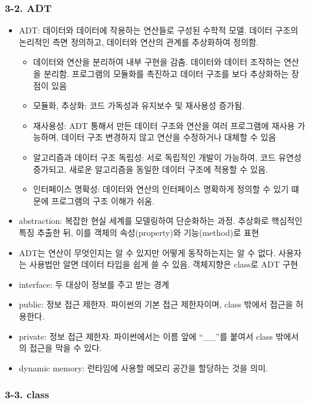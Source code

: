 \hypertarget{adt}{%
\subsubsection{3-2. ADT}\label{adt}}

\begin{itemize}
\tightlist
\item
  ADT: 데이터와 데이터에 작용하는 연산들로 구성된 수학적 모델. 데이터
  구조의 논리적인 측면 정의하고, 데이터와 연산의 관계를 추상화하여
  정의함.

  \begin{itemize}
  \tightlist
  \item
    데이터와 연산을 분리하여 내부 구현을 감춤. 데이터와 데이터 조작하는
    연산을 분리함. 프로그램의 모듈화를 촉진하고 데이터 구조를 보다
    추상화하는 장점이 있음
  \item
    모듈화, 추상화: 코드 가독성과 유지보수 및 재사용성 증가됨.
  \item
    재사용성: ADT 통해서 만든 데이터 구조와 연산을 여러 프로그램에
    재사용 가능하며, 데이터 구조 변경하지 않고 연산을 수정하거나 대체할
    수 있음
  \item
    알고리즘과 데이터 구조 독립성: 서로 독립적인 개발이 가능하여, 코드
    유연성 증가되고, 새로운 알고리즘을 동일한 데이터 구조에 적용할 수
    있음.
  \item
    인터페이스 명확성: 데이터와 연산의 인터페이스 명확하게 정의할 수
    있기 떄문에 프로그램의 구조 이해가 쉬움.
  \end{itemize}
\item
  abstraction: 복잡한 현실 세계를 모델링하여 단순화하는 과정. 추상화로
  핵심적인 특징 추출한 뒤, 이를 객체의 속성(property)와 기능(method)로
  표현
\item
  ADT는 연산이 무엇인지는 알 수 있지만 어떻게 동작하는지는 알 수 없다.
  사용자는 사용법만 알면 데이터 타입을 쉽게 쓸 수 있음. 객체지향은
  class로 ADT 구현
\item
  interface: 두 대상이 정보를 주고 받는 경계
\item
  public: 정보 접근 제한자. 파이썬의 기본 접근 제한자이며, class 밖에서
  접근을 허용한다.
\item
  private: 정보 접근 제한자. 파이썬에서는 이름 앞에 ``\_\_''를 붙여서
  class 밖에서의 접근을 막을 수 있다.
\item
  dynamic memory: 런타임에 사용할 메모리 공간을 할당하는 것을 의미.
\end{itemize}

\hypertarget{class}{%
\subsubsection{3-3. class}\label{class}}

